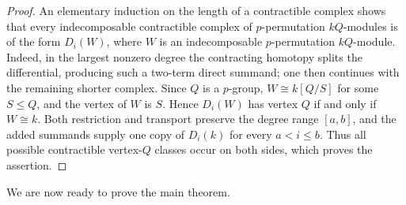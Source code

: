 \documentclass[preprint,12pt,3p]{elsarticle}
\begin{document}
\begin{proof}
An elementary induction on the length of a contractible complex shows that every indecomposable contractible complex of $p$-permutation $kQ$-modules is of the form $D_i(W)$, where $W$ is an indecomposable $p$-permutation $kQ$-module. Indeed, in the largest nonzero degree the contracting homotopy splits the differential, producing such a two-term direct summand; one then continues with the remaining shorter complex. Since $Q$ is a $p$-group, $W\cong k[Q/S]$ for some $S\leq Q$, and the vertex of $W$ is $S$. Hence $D_i(W)$ has vertex $Q$ if and only if $W\cong k$. Both restriction and transport preserve the degree range $[a,b]$, and the added summands supply one copy of $D_i(k)$ for every $a<i\leq b$. Thus all possible contractible vertex-$Q$ classes occur on both sides, which proves the assertion.
\end{proof}

We are now ready to prove the main theorem.
\end{document}
